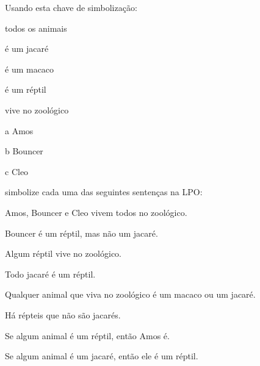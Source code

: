 \solutions
\problempart\label{pr.FOLalligators}
Usando esta chave de simbolização:
\begin{ekey}
\item[\text{domínio}] todos os animais
\item[\atom{A}{x}]  é um jacaré
\item[\atom{M}{x}]  é um macaco
\item[\atom{R}{x}]  é um réptil
\item[\atom{Z}{x}]  vive no zoológico
\item[a] Amos
\item[b] Bouncer
\item[c] Cleo
\end{ekey}
simbolize cada uma das seguintes sentenças na LPO:
\begin{compactlist}
\item Amos, Bouncer e Cleo vivem todos no zoológico.
\item[] 
\item Bouncer é um réptil, mas não um jacaré.
\item[] 
\item Algum réptil vive no zoológico.
\item[] 
\item Todo jacaré é um réptil.
\item[] 
\item Qualquer animal que viva no zoológico é um macaco ou um jacaré.
\item[] 
\item Há répteis que não são jacarés.
\item[] 
\item Se algum animal é um réptil, então Amos é.
\item[] 
\item Se algum animal é um jacaré, então ele é um réptil.
\item[] 
\end{compactlist}

